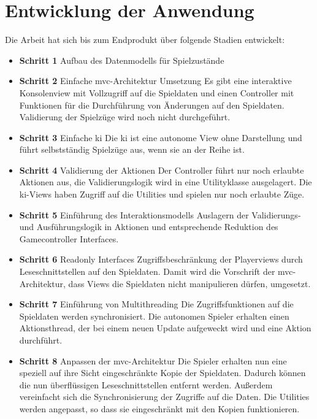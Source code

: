 \documentclass[
							a4paper, 
							11pt, 
							openany, 
							liststotoc,
							parskip=half, 
   							headings=normal
						]{scrreprt}
\begin{document}
{\section{Entwicklung der Anwendung} \label{se:anwendung_entwicklung}
Die Arbeit hat sich bis zum Endprodukt über folgende Stadien entwickelt:
\begin{itemize}
	\item \textbf{Schritt 1} Aufbau des Datenmodells für Spielzustände
	\item \textbf{Schritt 2} Einfache \acs{mvc}-Architektur Umsetzung\newline
Es gibt eine interaktive Konsolenview mit Vollzugriff auf die Spieldaten und einen Controller mit Funktionen für die Durchführung von Änderungen auf den Spieldaten. Validierung der Spielzüge wird noch nicht durchgeführt.
	\item \textbf{Schritt 3} Einfache \acs{ki}\newline
Die \acs{ki} ist eine autonome View ohne Darstellung und führt selbstständig Spielzüge aus, wenn sie an der Reihe ist.
	\item \textbf{Schritt 4} Validierung der Aktionen\newline
Der Controller führt nur noch erlaubte Aktionen aus, die Validierungslogik wird in eine Utilityklasse ausgelagert. Die \acs{ki}-Views haben Zugriff auf die Utilities und spielen nur noch erlaubte Züge.
	\item \textbf{Schritt 5} Einführung des Interaktionsmodells\newline 
Auslagern der Validierungs- und Ausführungslogik in Aktionen und entsprechende Reduktion des Gamecontroller Interfaces.
	\item \textbf{Schritt 6} Readonly Interfaces\newline
Zugriffsbeschränkung der Playerviews durch Leseschnittstellen auf den Spieldaten. Damit wird die Vorschrift der \acs{mvc}-Architektur, dass Views die Spieldaten nicht manipulieren dürfen, umgesetzt.
	\item \textbf{Schritt 7} Einführung von Multithreading\newline
Die Zugriffsfunktionen auf die Spieldaten werden synchronisiert. Die autonomen Spieler erhalten einen Aktionsthread, der bei einem neuen Update aufgeweckt wird und eine Aktion durchführt.
	\item \textbf{Schritt 8} Anpassen der \acs{mvc}-Architektur\newline
Die Spieler erhalten nun eine speziell auf ihre Sicht eingeschränkte Kopie der Spieldaten. Dadurch können die nun überflüssigen Leseschnittstellen entfernt werden. Außerdem vereinfacht sich die Synchronisierung der Zugriffe auf die Daten. Die Utilities werden angepasst, so dass sie eingeschränkt mit den Kopien funktionieren.

\end{itemize}}
\end{document}
